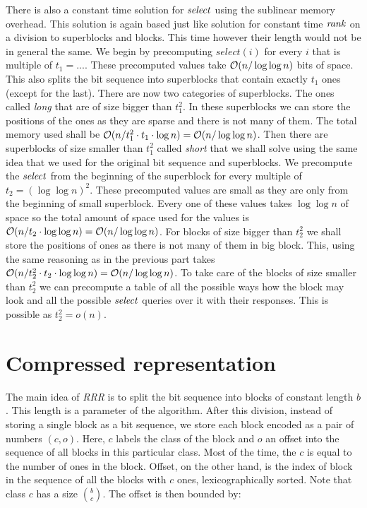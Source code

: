 There is also a constant time solution for $\mathit{select}$ using the sublinear memory overhead.
This solution is again based just like solution for constant time $\mathit{rank}$ on a division
to superblocks and blocks. This time however their length would not be in general the same.
We begin by precomputing $select(i)$ for every $i$ that is multiple of $t_1=...$.
These precomputed values take $\mathcal{O}(n/\log\log n)$ bits of space. This also splits the bit
sequence into superblocks that contain exactly $t_1$ ones (except for the last). There are
now two categories of superblocks. The ones called \textit{long} that are of size bigger
than $t_1^2$. In these superblocks we can store the positions of the ones as they are sparse
and there is not many of them. The total memory used shall be $\mathcal{O}(n/t_1^2\cdot t_1\cdot
\log n) = \mathcal{O}(n/\log\log n)$. Then there are superblocks of size smaller than $t_1^2$ called
\textit{short} that we shall solve using the same idea that we used for the original bit sequence
and superblocks. We precompute the $\mathit{select}$ from the beginning of the superblock for every
multiple of $t_2=(\log\log n)^2$. These precomputed values are small as they are only from the
beginning of small superblock. Every one of these values takes $\log\log n$ of space so the
total amount of space used for the values is $\mathcal{O}(n/t_2\cdot \log\log n) = \mathcal{O}(n/\log\log n)$.
For blocks of size bigger than $t_2^2$ we shall store the positions of ones as there is not
many of them in big block. This, using the same reasoning as in the previous part takes
$\mathcal{O}(n/t_2^2\cdot t_2\cdot \log\log n) = \mathcal{O}(n/\log\log n)$. To take care of the
blocks of size smaller than $t_2^2$ we can precompute a table of all the possible ways how
the block may look and all the possible $\mathit{select}$ queries over it with their responses.
This is possible as $t_2^2 = o(n)$.

\section{Compressed representation}
\label{section:compressed_bv}

The main idea of \textit{RRR} is to split the bit sequence into blocks of constant length $b$.
This length is a parameter of the algorithm. After this division, instead
of storing a single block as a bit sequence, we store each block encoded as a pair
of numbers $(c, o)$. Here, $c$ labels the class of the block and $o$ an offset into
the sequence of all blocks in this particular class. Most of the time, the $c$ is equal
to the number of ones in the block. Offset, on the other hand, is the index of block in
the sequence of all the blocks with $c$ ones, lexicographically sorted. Note that
class $c$ has a size ${b\choose c}$. The offset is then bounded by:

